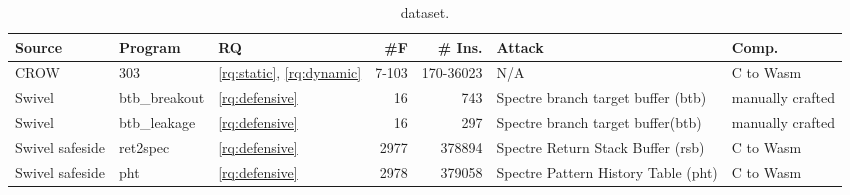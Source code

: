 
\begin{table}
\renewcommand\arraystretch{1.1}
\begin{adjustbox}{width=\linewidth,totalheight=\textheight, keepaspectratio}
    \begin{tabular}{p{1.2cm} | l | l | r | r | p{2cm} | p{1cm} }
        \hline
        Source & Program & RQ & \#F & \# Ins. & Attack & Comp. \\
        \hline \hline
        CROW & 303 & \ref{rq:static}, \ref{rq:dynamic} & 7-103 & 170-36023 & N/A & C to Wasm \\
        \hline
        Swivel & btb\_breakout & \ref{rq:defensive} & 16 & 743 & Spectre branch target buffer (btb) & manually crafted \\
        \hline
        Swivel & btb\_leakage & \ref{rq:defensive} & 16 & 297 & Spectre branch target buffer(btb) & manually crafted \\
        \hline
        Swivel safeside & ret2spec & \ref{rq:defensive} & 2977 & 378894 & Spectre Return Stack Buffer (rsb) & C to Wasm \\
        \hline
        Swivel safeside & pht & \ref{rq:defensive} & 2978 & 379058 & Spectre Pattern History Table (pht) & C to Wasm \\

    \end{tabular}
\end{adjustbox}
    
    \caption{\wasm dataset.}
    \label{tab:corpus}
\end{table}
